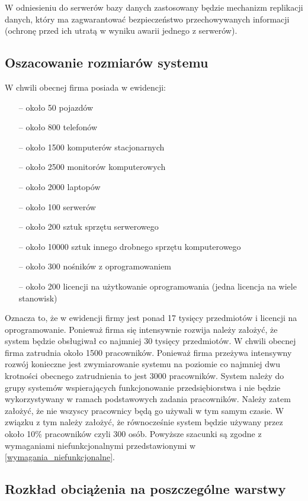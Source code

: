 W odniesieniu do serwerów bazy danych zastosowany będzie mechanizm replikacji danych, który ma zagwarantować bezpieczeństwo przechowywanych informacji (ochronę przed ich utratą w wyniku awarii jednego z serwerów).

\subsection{Oszacowanie rozmiarów systemu}

W chwili obecnej firma posiada w ewidencji:

\begin{itemize}
\item[--] około 50 pojazdów
\item[--] około 800 telefonów
\item[--] około 1500 komputerów stacjonarnych
\item[--] około 2500 monitorów komputerowych
\item[--] około 2000 laptopów
\item[--] około 100 serwerów
\item[--] około 200 sztuk sprzętu serwerowego
\item[--] około 10000 sztuk innego drobnego sprzętu komputerowego
\item[--] około 300 nośników z oprogramowaniem
\item[--] około 200 licencji na użytkowanie oprogramowania (jedna licencja na wiele stanowisk)
\end{itemize}

Oznacza to, że w ewidencji firmy jest ponad 17 tysięcy przedmiotów i
licencji na oprogramowanie. Ponieważ firma się intensywnie rozwija
należy założyć, że system będzie obsługiwał co najmniej 30 tysięcy
przedmiotów. W chwili obecnej firma zatrudnia około 1500
pracowników. Ponieważ firma przeżywa intensywny rozwój konieczne jest
zwymiarowanie systemu na poziomie co najmniej dwu krotności obecnego
zatrudnienia to jest 3000 pracowników. System należy do grupy systemów
wspierających funkcjonowanie przedsiębiorstwa i nie będzie
wykorzystywany w ramach podstawowych zadania pracowników. Należy zatem
założyć, że nie wszyscy pracownicy będą go używali w tym samym
czasie. W związku z tym należy założyć, że równocześnie system będzie
używany przez około 10\% pracowników czyli 300 osób. Powyższe szacunki
są zgodne z wymaganiami niefunkcjonalnymi przedstawionymi w
\ref{wymagania_niefunkcjonalne}.

\subsection{Rozkład obciążenia na poszczególne warstwy}

